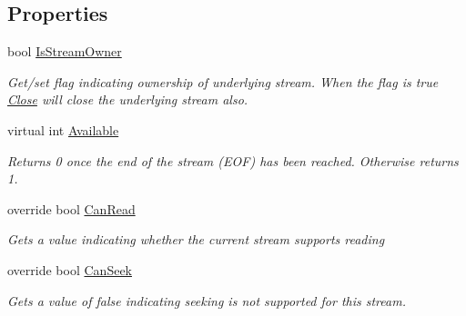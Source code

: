 \subsection*{Properties}
\begin{DoxyCompactItemize}
\item 
bool \hyperlink{class_i_c_sharp_code_1_1_sharp_zip_lib_1_1_zip_1_1_compression_1_1_streams_1_1_inflater_input_stream_ab9b5354e07738945e2f1ff664441088e}{Is\+Stream\+Owner}
\begin{DoxyCompactList}\small\item\em Get/set flag indicating ownership of underlying stream. When the flag is true \hyperlink{class_i_c_sharp_code_1_1_sharp_zip_lib_1_1_zip_1_1_compression_1_1_streams_1_1_inflater_input_stream_a715fe9700f28d1b596de4414114f4c92}{Close} will close the underlying stream also. \end{DoxyCompactList}\item 
virtual int \hyperlink{class_i_c_sharp_code_1_1_sharp_zip_lib_1_1_zip_1_1_compression_1_1_streams_1_1_inflater_input_stream_ac9e68e3d341ac7ed248ee6ab9a5652b5}{Available}
\begin{DoxyCompactList}\small\item\em Returns 0 once the end of the stream (E\+OF) has been reached. Otherwise returns 1. \end{DoxyCompactList}\item 
override bool \hyperlink{class_i_c_sharp_code_1_1_sharp_zip_lib_1_1_zip_1_1_compression_1_1_streams_1_1_inflater_input_stream_a7d24f65e04446cc742117f6cc690e986}{Can\+Read}
\begin{DoxyCompactList}\small\item\em Gets a value indicating whether the current stream supports reading \end{DoxyCompactList}\item 
override bool \hyperlink{class_i_c_sharp_code_1_1_sharp_zip_lib_1_1_zip_1_1_compression_1_1_streams_1_1_inflater_input_stream_a7fd0a95800acad7dced539af054ff635}{Can\+Seek}
\begin{DoxyCompactList}\small\item\em Gets a value of false indicating seeking is not supported for this stream. \end{DoxyCompactList}\item 

\end{DoxyCompactItemize}
